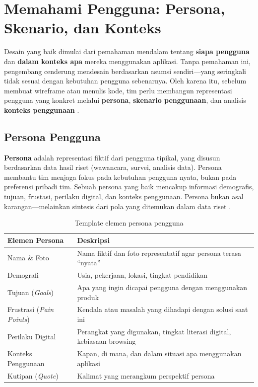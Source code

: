 \section{Memahami Pengguna: Persona, Skenario, dan Konteks}

Desain yang baik dimulai dari pemahaman mendalam tentang \textbf{siapa pengguna} dan \textbf{dalam konteks apa} mereka menggunakan aplikasi. Tanpa pemahaman ini, pengembang cenderung mendesain berdasarkan asumsi sendiri---yang seringkali tidak sesuai dengan kebutuhan pengguna sebenarnya. Oleh karena itu, sebelum membuat wireframe atau menulis kode, tim perlu membangun representasi pengguna yang konkret melalui \textbf{persona}, \textbf{skenario penggunaan}, dan analisis \textbf{konteks penggunaan} \cite{nngroup}.

\subsection{Persona Pengguna}

\textbf{Persona} adalah representasi fiktif dari pengguna tipikal, yang disusun berdasarkan data hasil riset (wawancara, survei, analisis data). Persona membantu tim menjaga fokus pada kebutuhan pengguna nyata, bukan pada preferensi pribadi tim. Sebuah persona yang baik mencakup informasi demografis, tujuan, frustasi, perilaku digital, dan konteks penggunaan. Persona bukan asal karangan---melainkan sintesis dari pola yang ditemukan dalam data riset \cite{ixdf}.

\begin{table}[htbp]
\centering
\begin{tabular}{|P{3.5cm}|P{8.5cm}|}
\hline
\textbf{Elemen Persona} & \textbf{Deskripsi} \\
\hline
Nama \& Foto & Nama fiktif dan foto representatif agar persona terasa ``nyata'' \\
\hline
Demografi & Usia, pekerjaan, lokasi, tingkat pendidikan \\
\hline
Tujuan (\textit{Goals}) & Apa yang ingin dicapai pengguna dengan menggunakan produk \\
\hline
Frustrasi (\textit{Pain Points}) & Kendala atau masalah yang dihadapi dengan solusi saat ini \\
\hline
Perilaku Digital & Perangkat yang digunakan, tingkat literasi digital, kebiasaan browsing \\
\hline
Konteks Penggunaan & Kapan, di mana, dan dalam situasi apa menggunakan aplikasi \\
\hline
Kutipan (\textit{Quote}) & Kalimat yang merangkum perspektif persona \\
\hline
\end{tabular}
\caption{Template elemen persona pengguna}
\end{table}

